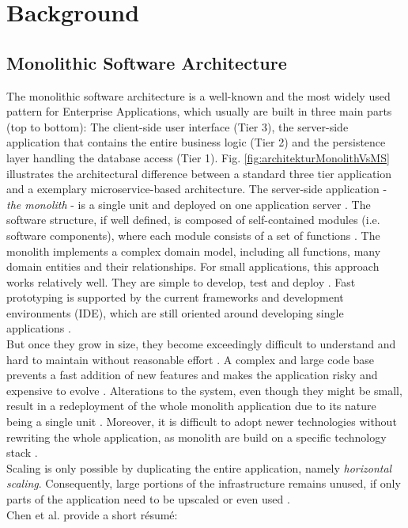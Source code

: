 \chapter{Background}
\label{ch:background}

\section{Monolithic Software Architecture}
\label{sec:background:monolith}
The monolithic software architecture is a well-known and the most widely used pattern for Enterprise Applications, which usually are built in three main parts (top to bottom): The client-side user interface (Tier 3), the server-side application that contains the entire business logic (Tier 2) and the persistence layer handling the database access (Tier 1). Fig. \ref{fig:architekturMonolithVsMS} illustrates the architectural difference between a standard three tier application and a exemplary microservice-based architecture. The server-side application - \textit{the monolith} - is a single unit and deployed on one application server \cite{infoq}. The software structure, if well defined, is composed of self-contained modules (i.e. software components), where each module consists of a set of functions \cite{HeuristicsAlwis}.
The monolith implements a complex domain model, including all functions, many domain entities and their relationships.
For small applications, this approach works relatively well. They are simple to develop, test and deploy \cite{FunctionalDecompositionHeinrich}. Fast prototyping is supported by the current frameworks and development environments (IDE), which are still oriented around developing single applications \cite{infoq}.
\\
But once they grow in size, they become exceedingly difficult to understand and hard to maintain without reasonable effort \cite{FunctionalDecompositionHeinrich} \cite{ClassificationOfRefactoring}. A complex and large code base prevents a fast addition of new features and makes the application risky and expensive to evolve \cite{TowardsTechnique}.
Alterations to the system, even though they might be small, result in a redeployment of the whole monolith application due to its nature being a single unit \cite{FunctionalDecompositionHeinrich}. Moreover, it is difficult to adopt newer technologies without rewriting the whole application, as monolith are build on a specific technology stack \cite{infoq} \cite{ExtractionMazlami}.\\
Scaling is only possible by duplicating the entire application, namely \textit{horizontal scaling}. Consequently, large portions of the infrastructure remains unused, if only parts of the application need to be upscaled or even used \cite{EnticeApproach} \cite{MigratingTowardsSurvey}. \\
Chen et al. provide a short résumé:

